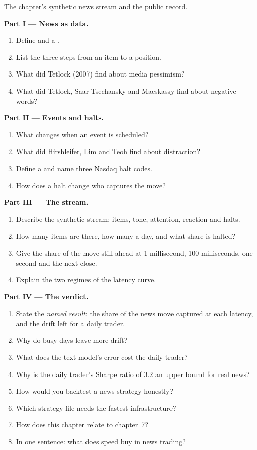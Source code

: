 \begin{problem}\label{pb:s1:news-and-events:1}
The chapter's synthetic news stream and the public record.

\medskip\noindent\textbf{Part I --- News as data.}
\begin{enumerate}
\item Define  and a .
\item List the three steps from an item to a position.
\item What did Tetlock (2007) find about media pessimism?
\item What did Tetlock, Saar-Tsechansky and Macskassy find about negative words?
\end{enumerate}

\medskip\noindent\textbf{Part II --- Events and halts.}
\begin{enumerate}[resume]
\item What changes when an event is scheduled?
\item What did Hirshleifer, Lim and Teoh find about distraction?
\item Define a  and name three Nasdaq halt codes.
\item How does a halt change who captures the move?
\end{enumerate}

\medskip\noindent\textbf{Part III --- The stream.}
\begin{enumerate}[resume]
\item Describe the synthetic stream: items, tone, attention, reaction and halts.
\item How many items are there, how many a day, and what share is halted?
\item Give the share of the move still ahead at 1 millisecond, 100 milliseconds, one second and the next close.
\item Explain the two regimes of the latency curve.
\end{enumerate}

\medskip\noindent\textbf{Part IV --- The verdict.}
\begin{enumerate}[resume]
\item State the \emph{named result}: the share of the news move captured at each latency, and the drift left for a daily trader.
\item Why do busy days leave more drift?
\item What does the text model's error cost the daily trader?
\item Why is the daily trader's Sharpe ratio of 3.2 an upper bound for real news?
\item How would you backtest a news strategy honestly?
\item Which strategy file needs the fastest infrastructure?
\item How does this chapter relate to chapter~7?
\item In one sentence: what does speed buy in news trading?
\end{enumerate}
\end{problem}

